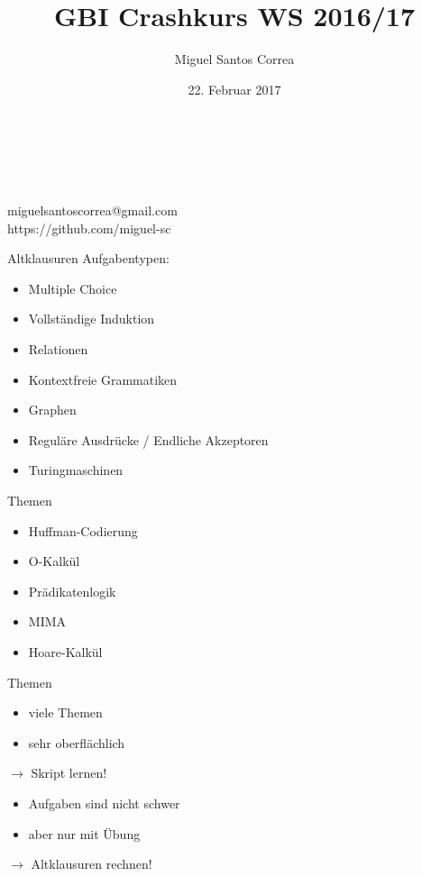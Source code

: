 \documentclass[18pt]{beamer}
\title[GBI Crashkurs]{GBI Crashkurs WS 2016/17}
\author{Miguel Santos Correa}
\date{22. Februar 2017}
\begin{document}


\begin{frame}
  \begin{center}
    \huge\inserttitle\\
    \vskip 1.75mm
    \normalsize
    \insertauthor\\
    \insertdate\\
    \vskip 1.75mm
    \large
    miguelsantoscorrea@gmail.com\\
    \vskip 1.75mm
    https://github.com/miguel-sc
  \end{center}
\end{frame}

\begin{frame}{Altklausuren}
  Aufgabentypen:
  \begin{itemize}
    \item Multiple Choice
    \item Vollständige Induktion
    \item Relationen
    \item Kontextfreie Grammatiken
    \item Graphen
    \item Reguläre Ausdrücke / Endliche Akzeptoren
    \item Turingmaschinen
  \end{itemize}
\end{frame}

\begin{frame}{Themen}
  \begin{itemize}
    \item Huffman-Codierung
    \item O-Kalkül
    \item Prädikatenlogik
    \item MIMA
    \item Hoare-Kalkül
  \end{itemize}
\end{frame}

\begin{frame}{Themen}
  \begin{itemize}
    \item viele Themen
    \item sehr oberflächlich
  \end{itemize}
  $\rightarrow$ Skript lernen!
  \pause
  \begin{itemize}
    \item Aufgaben sind nicht schwer
    \item aber nur mit Übung
  \end{itemize}
  $\rightarrow$ Altklausuren rechnen!
\end{frame}
\end{document}
